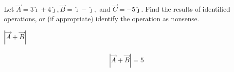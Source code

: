 Let $\vec{A}=3 \hat{\imath}+4 \hat{\jmath}, \vec{B}=\hat{\imath}-\hat{\jmath},$ and $\vec{C}=-5 \hat{\jmath} .$ Find the results of identified operations, or (if appropriate) identify the operation as nonsense.

$\left|\overrightarrow{A} + \overrightarrow{B}\right|$

\begin{solution}
\begin{align*}
    \left|\overrightarrow{A} + \overrightarrow{B}\right| = 5
\end{align*}
\end{solution}